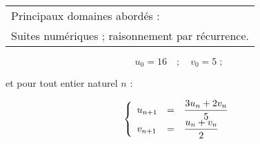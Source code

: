 
\medskip

\begin{tabular}{|l|}\hline
Principaux domaines abordés :\\
Suites numériques ; raisonnement par récurrence.\\ \hline
\end{tabular}

\medskip


\[u_0 = 16 \quad ;\quad  v_0 = 5 \;;\]

et pour tout entier naturel $n$ :

\renewcommand\arraystretch{2}
\[\left\{\begin{array}{l c l}
u_{n+1}&=&\dfrac{3u_n + 2v_n}{5}\\
v_{n+1}&=& \dfrac{u_n + v_n}{2}
\end{array}\right.\]
\renewcommand\arraystretch{1}

\smallskip

